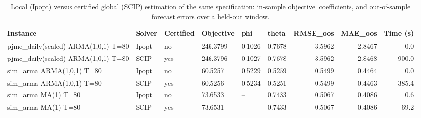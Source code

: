 \begin{table}[t]
\centering
\caption{Local (Ipopt) versus certified global (SCIP) estimation of the same specification: in-sample objective, coefficients, and out-of-sample forecast errors over a held-out window.}
\label{tab:global_value}
\begin{tabular}{llllllrrr}
\hline
Instance & Solver & Certified & Objective & phi & theta & RMSE\_oos & MAE\_oos & Time (s) \\
\hline
pjme\_daily(scaled) ARMA(1,0,1) T=80 & Ipopt & no & 246.3799 & 0.1026 & 0.7678 & 3.5962 & 2.8467 & 0.0 \\
pjme\_daily(scaled) ARMA(1,0,1) T=80 & SCIP & yes & 246.3796 & 0.1027 & 0.7678 & 3.5962 & 2.8468 & 900.0 \\
sim\_arma ARMA(1,0,1) T=80 & Ipopt & no & 60.5257 & 0.5229 & 0.5259 & 0.5499 & 0.4464 & 0.0 \\
sim\_arma ARMA(1,0,1) T=80 & SCIP & yes & 60.5256 & 0.5234 & 0.5251 & 0.5499 & 0.4463 & 385.4 \\
sim\_arma MA(1) T=80 & Ipopt & no & 73.6533 & -- & 0.7433 & 0.5067 & 0.4086 & 0.6 \\
sim\_arma MA(1) T=80 & SCIP & yes & 73.6531 & -- & 0.7433 & 0.5067 & 0.4086 & 69.2 \\
\hline
\end{tabular}
\end{table}